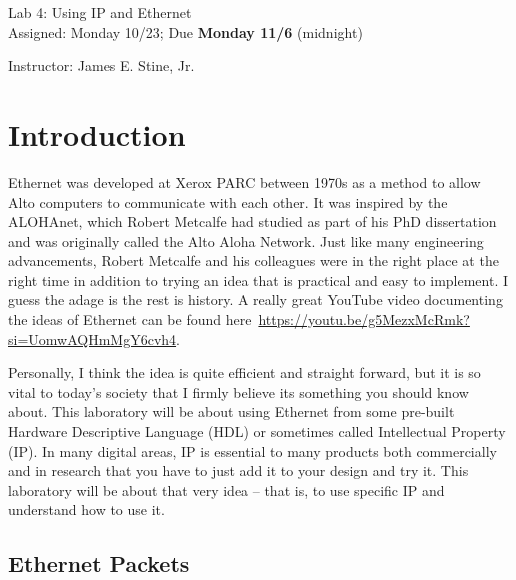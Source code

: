 \documentclass{article}
\newcommand{\myassignment}{Lab 4: Using IP and Ethernet}
\newcommand{\myduedate}{Assigned: Monday 10/23; Due \textbf{Monday 11/6} (midnight)}
\newcommand{\myinstructor}{Instructor: James E. Stine, Jr.}
\begin{document}
\begin{center}
  {\huge \myassignment} \\
  {\large \myduedate} \\
  \begin{flushright}
  \myinstructor \\
  \end{flushright}
\end{center}

\section{Introduction}

Ethernet was developed at Xerox PARC between 1970s as a
method to allow Alto computers to communicate with each other. It
was inspired by the ALOHAnet, which Robert Metcalfe had studied as part of
his PhD dissertation and was originally called the Alto Aloha
Network.  Just like many engineering advancements, Robert Metcalfe and
his colleagues were in the right place at the right time in addition
to trying an idea that is practical and easy to implement.  I guess
the adage is the rest is history.
A really great YouTube video documenting the ideas of Ethernet can be
found here~\url{https://youtu.be/g5MezxMcRmk?si=UomwAQHmMgY6cvh4}.  

Personally, I think the idea is quite efficient and straight forward,
but it is so vital to today's society that I firmly believe its
something you should know about.  This laboratory will be about using
Ethernet from some pre-built Hardware Descriptive Language (HDL) or
sometimes called Intellectual Property (IP).  In many digital areas,
IP is essential to many products both commercially and in research
that you have to just add it to your design and try it.  This
laboratory will be about that very idea -- that is, to use specific IP
and understand how to use it.

\subsection{Ethernet Packets}




\end{document}
